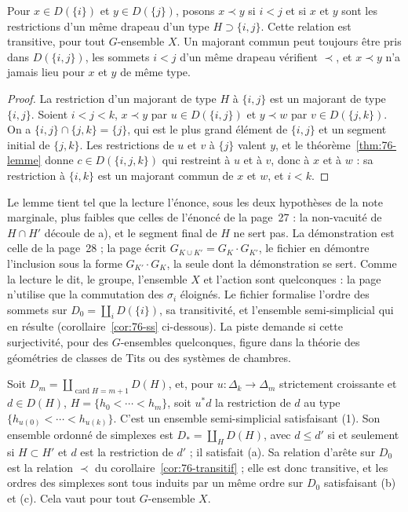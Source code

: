 \begin{corollaire}[page 27]\label{cor:76-transitif}
Pour $x \in D(\{i\})$ et $y \in D(\{j\})$, posons $x \prec y$ si $i < j$ et si $x$ et $y$ sont les restrictions d'un même drapeau d'un type $H \supset \{i, j\}$. Cette relation est transitive, pour tout $G$-ensemble $X$. Un majorant commun peut toujours être pris dans $D(\{i, j\})$, les sommets $i < j$ d'un même drapeau vérifient $\prec$, et $x \prec y$ n'a jamais lieu pour $x$ et $y$ de même type.
\end{corollaire}

\begin{proof}
La restriction d'un majorant de type $H$ à $\{i, j\}$ est un majorant de type $\{i, j\}$. Soient $i < j < k$, $x \prec y$ par $u \in D(\{i, j\})$ et $y \prec w$ par $v \in D(\{j, k\})$. On a $\{i, j\} \cap \{j, k\} = \{j\}$, qui est le plus grand élément de $\{i, j\}$ et un segment initial de $\{j, k\}$. Les restrictions de $u$ et $v$ à $\{j\}$ valent $y$, et le théorème~\ref{thm:76-lemme} donne $c \in D(\{i, j, k\})$ qui restreint à $u$ et à $v$, donc à $x$ et à $w$ : sa restriction à $\{i, k\}$ est un majorant commun de $x$ et $w$, et $i < k$.
\end{proof}

\begin{remarque}
Le lemme tient tel que la lecture l'énonce, sous les deux hypothèses de la note marginale, plus faibles que celles de l'énoncé de la page~27 : la non-vacuité de $H \cap H'$ découle de a), et le segment final de $H$ ne sert pas. La démonstration est celle de la page~28 ; la page écrit $G_{K \cup K'} = G_K \cdot G_{K'}$, le fichier en démontre l'inclusion sous la forme $G_{K'} \cdot G_K$, la seule dont la démonstration se sert. Comme la lecture le dit, le groupe, l'ensemble $X$ et l'action sont quelconques : la page n'utilise que la commutation des $\sigma_i$ éloignés. Le fichier formalise l'ordre des sommets sur $D_0 = \coprod_i D(\{i\})$, sa transitivité, et l'ensemble semi-simplicial qui en résulte (corollaire~\ref{cor:76-ss} ci-dessous). La piste demande si cette surjectivité, pour des $G$-ensembles quelconques, figure dans la théorie des géométries de classes de Tits ou des systèmes de chambres.
\end{remarque}

\begin{corollaire}\label{cor:76-ss}
Soit $D_m = \coprod_{\operatorname{card} H = m+1} D(H)$, et, pour $u \colon \Delta_k \to \Delta_m$ strictement croissante et $d \in D(H)$, $H = \{h_0 < \cdots < h_m\}$, soit $u^*d$ la restriction de $d$ au type $\{h_{u(0)} < \cdots < h_{u(k)}\}$. C'est un ensemble semi-simplicial satisfaisant (1). Son ensemble ordonné de simplexes est $D_* = \coprod_H D(H)$, avec $d \leq d'$ si et seulement si $H \subset H'$ et $d$ est la restriction de $d'$ ; il satisfait (a). Sa relation d'arête sur $D_0$ est la relation $\prec$ du corollaire~\ref{cor:76-transitif} ; elle est donc transitive, et les ordres des simplexes sont tous induits par un même ordre sur $D_0$ satisfaisant (b) et (c). Cela vaut pour tout $G$-ensemble $X$.
\end{corollaire}

